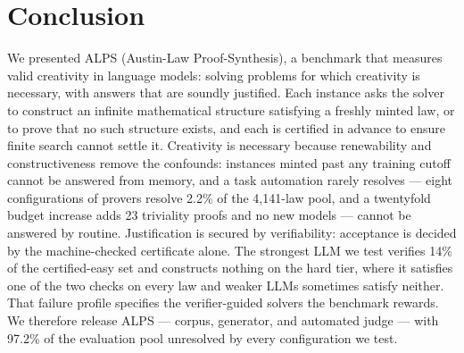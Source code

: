 \documentclass[letterpaper]{article} %
\begin{document}
\section{Conclusion}

We presented ALPS (Austin-Law Proof-Synthesis), a benchmark that measures valid creativity in language models: solving problems for which creativity is necessary, with answers that are soundly justified. Each instance asks the solver to construct an infinite mathematical structure satisfying a freshly minted law, or to prove that no such structure exists, and each is certified in advance to ensure finite search cannot settle it. Creativity is necessary because renewability and constructiveness remove the confounds: instances minted past any training cutoff cannot be answered from memory, and a task automation rarely resolves --- eight configurations of provers resolve 2.2\% of the 4,141-law pool, and a twentyfold budget increase adds 23 triviality proofs and no new models --- cannot be answered by routine. Justification is secured by verifiability: acceptance is decided by the machine-checked certificate alone. The strongest LLM we test verifies 14\% of the certified-easy set and constructs nothing on the hard tier, where it satisfies one of the two checks on every law and weaker LLMs sometimes satisfy neither. That failure profile specifies the verifier-guided solvers the benchmark rewards. We therefore release ALPS --- corpus, generator, and automated judge --- with 97.2\% of the evaluation pool unresolved by every configuration we test.




% 

%
\end{document}
